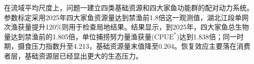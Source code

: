 在流域平均尺度上，问题一建立四类基础资源和四大家鱼功能群的配对动力系统。参数标定采用2025年四大家鱼资源量达到禁渔前1.8倍这一观测值，湖北江段单网次渔获量提升120\%则用于检查局地结果。结果显示，到2025年，四大家鱼总生物量达到禁渔前的1.805倍，单位捕捞努力量渔获量($\mathrm{CPUE}^*$)达到1.838倍；同一时期，摄食压力指数升至4.213，基础资源量末值降至0.204。恢复效应主要落在消费者层，基础资源层已经显出更大的生态压力。
